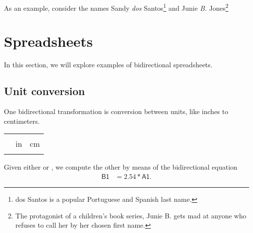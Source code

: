 \documentclass{article}
\newcommand\cell[1]{\mathsf{#1}}
\begin{document}
As an example, consider the names Sandy \emph{dos} Santos\footnote{dos Santos
is a popular Portuguese and Spanish last name.}
and Junie \emph{B.} Jones\footnote{The protagonist of a children's
book series, Junie B. gets mad at anyone who refuses to call her by her chosen
first name.}


\section{Spreadsheets}
In this section, we will explore examples of bidirectional spreadsheets.

\subsection{Unit conversion}
One bidirectional transformation is conversion between units, like inches
to centimeters.
\begin{center}\begin{tabular}{c | c | c |}
    & \cell{A} & \cell{B} \\
    & in & cm \\
    \hline
    \cell 1 & & \\
    \hline
\end{tabular}\end{center}
Given either \cell{A1} or \cell{B1}, we compute
the other by means of the bidirectional equation
\begin{align*}
    \cell{B1} &= 2.54*\cell{A1}.
\end{align*}
\end{document}
